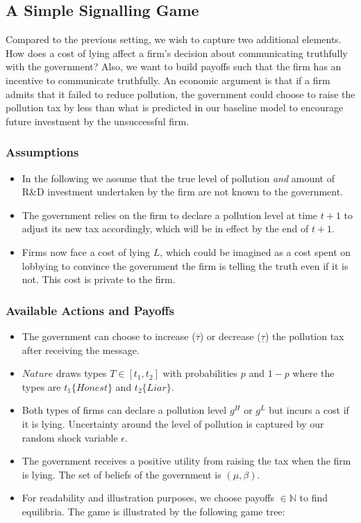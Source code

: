 \documentclass{article}
\begin{document}
\subsection{A Simple Signalling Game}

Compared to the previous setting, we wish to capture two additional elements. How does a cost of lying affect a firm's decision about communicating truthfully with the government? Also, we want to build payoffs such that the firm has an incentive to communicate truthfully. An economic argument is that if a firm admits that it failed to reduce pollution, the government could choose to raise the pollution tax by less than what is predicted in  our baseline model to encourage future investment by the unsuccessful  firm. 

\subsubsection{Assumptions}

\begin{itemize}
    \item In the following we assume that the true level of pollution \textit{and} amount of R\&D investment undertaken by the firm are not known to the government.
    \item The government relies on the firm to declare a pollution level at time $t+1$ to adjust its new tax accordingly, which will be in effect by the end of $t+1$.
    \item Firms now face a cost of lying $L$, which could be imagined as a cost spent on lobbying to convince the government the firm is telling the truth even if it is not. This cost is private to the firm.
\end{itemize}

\subsubsection{Available Actions and Payoffs}

\begin{itemize}
    \item The government can choose to increase ($\overline{\tau}$) or  decrease ($\underline{\tau}$) the pollution tax after receiving the message.
    \item $Nature$ draws types $T \in [t_1, t_2]$ with probabilities $p$ and $1-p$ where the types are $t_1\{Honest\}$ and $t_2\{Liar\}$.
    \item Both types of firms can declare a pollution level $g^{H}$ or $g^{L}$ but incurs a cost if it is lying. Uncertainty around the level of pollution is captured by our random shock variable $\epsilon$.
    \item The government receives a positive utility from raising the tax when the firm is lying. The set of beliefs of the government is $(\mu, \beta)$.
    \item For readability and illustration purposes, we choose payoffs $\in \mathbb{N}$ to find equilibria. The game is illustrated by the following game tree:
\end{itemize}
\pagebreak
\usetikzlibrary{positioning}
\end{document}
